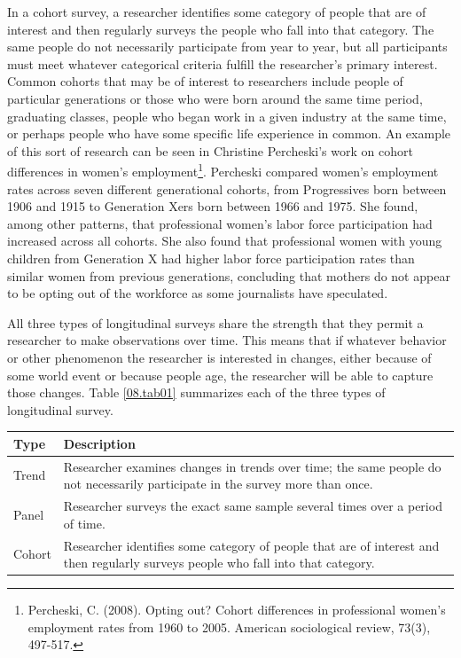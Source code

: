In a cohort survey, a researcher identifies some category of people that are of interest and then regularly surveys the people who fall into that category. The same people do not necessarily participate from year to year, but all participants must meet whatever categorical criteria fulfill the researcher's primary interest. Common cohorts that may be of interest to researchers include people of particular generations or those who were born around the same time period, graduating classes, people who began work in a given industry at the same time, or perhaps people who have some specific life experience in common. An example of this sort of research can be seen in Christine Percheski’s work on cohort differences in women's employment\footnote{Percheski, C. (2008). Opting out? Cohort differences in professional women's employment rates from 1960 to 2005. American sociological review, 73(3), 497-517.}. Percheski compared women's employment rates across seven different generational cohorts, from Progressives born between 1906 and 1915 to Generation Xers born between 1966 and 1975. She found, among other patterns, that professional women's labor force participation had increased across all cohorts. She also found that professional women with young children from Generation X had higher labor force participation rates than similar women from previous generations, concluding that mothers do not appear to be opting out of the workforce as some journalists have speculated.

All three types of longitudinal surveys share the strength that they permit a researcher to make observations over time. This means that if whatever behavior or other phenomenon the researcher is interested in changes, either because of some world event or because people age, the researcher will be able to capture those changes. Table \ref{08.tab01} summarizes each of the three types of longitudinal survey.

\vspace{.15in}
\begin{tabularx}{.95\linewidth}{p{0.50in}p{3.50in}}
	\hline
	\textbf{Type} & \textbf{Description} \\
	\hline

	Trend & Researcher examines changes in trends over time;
	the same people do not necessarily participate in the
	survey more than once. \\
	Panel & Researcher surveys the exact same sample several
	times over a period of time. \\
	Cohort & Researcher identifies some category of people that
	are of interest and then regularly surveys people who
	fall into that category.\\
	\hline
\end{tabularx}
\label{08.tab01}
\vspace{.15in}

